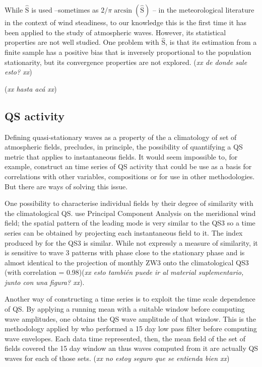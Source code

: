 \documentclass[draft,linenumbers]{agujournal2018}
\begin{document}
While \(\hat{\mathrm{S}}\) is used --sometimes as
\(2/\pi\arcsin \left (\hat{\mathrm{S}} \right )\) \citep{Singer1967}--
in the meteorological literature in the context of wind steadiness, to
our knowledge this is the first time it has been applied to the study of
atmospheric waves. However, its statistical properties are not well
studied. One problem with \(\hat{\mathrm{S}}\), is that its estimation
from a finite sample has a positive bias that is inversely proportional
to the population stationarity, but its convergence properties are not
explored. (\emph{xx de donde sale esto? xx})

(\emph{xx hasta acá xx})

\subsection{QS activity}

Defining quasi-stationary waves as a property of the a climatology of
set of atmospheric fields, precludes, in principle, the possibility of
quantifying a QS metric that applies to instantaneous fields. It would
seem impossible to, for example, construct an time series of QS activity
that could be use as a basis for correlations with other variables,
compositions or for use in other methodologies. But there are ways of
solving this issue.

One possibility to characterise individual fields by their degree of
similarity with the climatological QS. \citet{Yuan2008} use Principal
Component Analysis on the meridional wind field; the spatial pattern of
the leading mode is very similar to the QS3 so a time series can be
obtained by projecting each instantaneous field to it. The index
produced by \citet{Raphael2004} for the QS3 is similar. While not
expressly a measure of similarity, it is sensitive to wave 3 patterns
with phase close to the stationary phase and is almost identical to the
projection of monthly ZW3 onto the climatological QS3 (with correlation
= 0.98)(\emph{xx esto también puede ir al material suplementario, junto
con una figura? xx}).

Another way of constructing a time series is to exploit the time scale
dependence of QS. By applying a running mean with a suitable window
before computing wave amplitudes, one obtains the QS wave amplitude of
that window. This is the methodology applied by \citet{Wolf2018} who
performed a 15 day low pass filter before computing wave envelopes. Each
data time represented, then, the mean field of the set of fields covered
the 15 day window an thus waves computed from it are actually QS waves
for each of those sets. (\emph{xx no estoy seguro que se entienda bien
xx})
\end{document}

